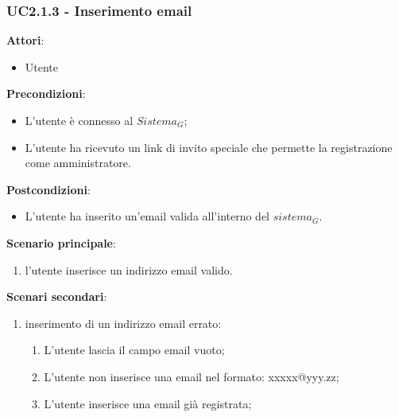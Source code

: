\subsubsection{UC2.1.3 - Inserimento email}\label{usecase:2_1_3}
\textbf{Attori}:
\begin{itemize}
    \item Utente
\end{itemize}
\textbf{Precondizioni}:
\begin{itemize}
    \item L'utente è connesso al $\textit{Sistema}_G$;
    \item L'utente ha ricevuto un link di invito speciale che permette la registrazione come amministratore.
\end{itemize}
\textbf{Postcondizioni}:
\begin{itemize}
    \item L'utente ha inserito un'email valida all'interno del $\textit{sistema}_G$.
\end{itemize}
\textbf{Scenario principale}:
\begin{enumerate}
    \item l'utente inserisce un indirizzo email valido.
\end{enumerate}
\textbf{Scenari secondari}:

\begin{enumerate}
    \item inserimento di un indirizzo email errato:
    \begin{enumerate}
            \item L'utente lascia il campo email vuoto;
            \item L'utente non inserisce una email nel formato: xxxxx@yyy.zz;
            \item L'utente inserisce una email già registrata;
        \end{enumerate} 
\end{enumerate}

